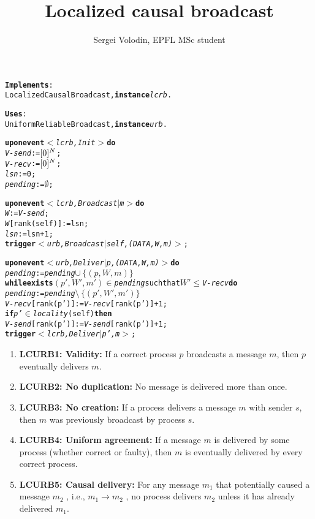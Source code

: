 \documentclass[a4paper]{article}
\title{Localized causal broadcast}
\author{Sergei Volodin, EPFL MSc student}
\date{}
\begin{document}
	
\maketitle

\begin{alltt}
\normalfont
\textbf{Implements}:
    LocalizedCausalBroadcast, \textbf{instance} \textit{lcrb}.

\textbf{Uses}:
    UniformReliableBroadcast, \textbf{instance} \textit{urb}.

\textbf{upon event} \textit{\(<\)lcrb, Init\(>\)} \textbf{do}
    \textit{V-send} := \([0]\sp{N}\);
    \textit{V-recv} := \([0]\sp{N}\);
    \textit{lsn} := 0;
    \textit{pending} := \(\emptyset\);

\textbf{upon event} \textit{\(<\)lcrb, Broadcast \(|\) \textit{m}\(>\)} \textbf{do}
    \textit{W} := \textit{V-send};
    \textit{W}[rank(self)] := lsn;
    \textit{lsn} := lsn + 1;
    \textbf{trigger} \textit{\(<\)urb, Broadcast \(|\) self, (DATA, W, m)\(>\)};

\textbf{upon event} \textit{\(<\)urb, Deliver \(|\) p, (DATA, W, m)\(>\)} \textbf{do}
    \textit{pending} := \textit{pending} \(\cup\,\{(p,W,m)\}\) 
    \textbf{while exists} \((p',W',m')\) \(\in\) \textit{pending} such that \(W'\leq \)\textit{V-recv} \textbf{do}
        \textit{pending} := \textit{pending} \(\setminus\,\{(p',W',m')\}\)
        \textit{V-recv}[rank(p')] := \textit{V-recv}[rank(p')] + 1;
        \textbf{if} \textit{p'} \(\in\) \textit{locality}(self) \textbf{then}
            \textit{V-send}[rank(p')] := \textit{V-send}[rank(p')] + 1;
        \textbf{trigger} \textit{\(<\)lcrb, Deliver \(|\) p', m\(>\)};
\end{alltt}

\begin{enumerate}
	\item {\bf LCURB1: Validity:} If a correct process $p$ broadcasts a message $m$, then $p$ eventually delivers $m$.
	
	\item {\bf LCURB2: No duplication:} No message is delivered more than once.
	
	\item {\bf LCURB3: No creation:} If a process delivers a message $m$ with sender $s$, then $m$ was previously broadcast by process $s$.
	
	\item {\bf LCURB4: Uniform agreement:} If a message $m$ is delivered by some process (whether correct or faulty), then $m$ is eventually delivered by every correct process.
	
	\item {\bf LCURB5: Causal delivery:} For any message $m_1$ that potentially caused a message $m_2$ , i.e., $m_1\to m_2$ , no process delivers $m_2$ unless it has already delivered $m_1$.
	
\end{enumerate}
\end{document}
